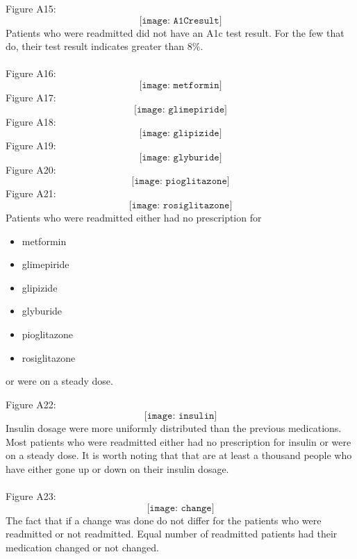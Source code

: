 \documentclass{article}
\begin{document}
Figure A15: $$ \texttt{[image: A1Cresult]}$$ 
Patients who were readmitted did not have an A1c test result. For the few that do, their test result indicates greater than $8\%$. 
\\~\\
Figure A16: $$ \texttt{[image: metformin]}$$ 
Figure A17: $$ \texttt{[image: glimepiride]}$$ 
Figure A18: $$ \texttt{[image: glipizide]}$$ 
Figure A19: $$ \texttt{[image: glyburide]}$$ 
Figure A20: $$ \texttt{[image: pioglitazone]}$$ 
Figure A21: $$ \texttt{[image: rosiglitazone]}$$ 
Patients who were readmitted either had no prescription for 
\begin{multicols}{3} \begin{itemize}
\item metformin \item glimepiride \item glipizide \item glyburide \item pioglitazone \item rosiglitazone \end{itemize} \end{multicols} or were on a steady dose. 

Figure A22: $$ \texttt{[image: insulin]}$$ 
Insulin dosage were more uniformly distributed than the previous medications. Most patients who were readmitted either had no prescription for insulin or were on a steady dose. It is worth noting that that are at least a thousand people who have either gone up or down on their insulin dosage. 
\\~\\
Figure A23: $$ \texttt{[image: change]}$$ 
The fact that if a change was done do not differ for the patients who were readmitted or not readmitted. Equal number of readmitted patients had their medication changed or not changed. 
\newpage
\end{document}

